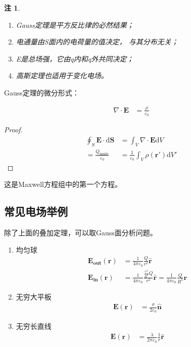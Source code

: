 \documentclass[12pt,onecolumn,a4paper]{book}
\newtheorem*{note}{注}
\numberwithin{table}{subsection}
\numberwithin{equation}{subsection}
\begin{document}
\begin{note}
    \begin{enumerate}
        \item Gauss定理是平方反比律的必然结果；
        \item 电通量由S面内的电荷量的值决定， 与其分布无关；
        \item E是总场强，它由q内和q外共同决定；
        \item 高斯定理也适用于变化电场。
    \end{enumerate}
\end{note}

Gauss定理的微分形式：

\begin{align}
    \nabla \cdot \mathbf{E} & = \frac{\rho}{\varepsilon_0}
\end{align}

\begin{proof}
    \begin{align}
        \oint_{S} \mathbf{E} \cdot \mathrm{d} \mathbf{S} & = \int_{V} \nabla \cdot \mathbf{E} \mathrm{d} V                    \\
        = \frac{Q_{\text{inside}}}{\varepsilon_0}
                                                         & = \frac{1}{\varepsilon_0} \int_{V} \rho(\mathbf{r'}) \mathrm{d} V'
    \end{align}
\end{proof}

这是Maxwell方程组中的第一个方程。

\subsection{常见电场举例}

除了上面的叠加定理，可以取Gauss面分析问题。

\begin{enumerate}
    \item 均匀球
          \begin{align}
              \mathbf{E_\text{out}}(\mathbf{r}) & = \frac{1}{4 \pi \varepsilon_0} \frac{Q}{r^2} \hat{\mathbf{r}}                                                                          \\
              \mathbf{E_\text{in}}(\mathbf{r})  & =  \frac{1}{4 \pi \varepsilon_0} \frac{\frac{r^3}{R^3}Q}{r^2} \hat{\mathbf{r}} = \frac{1}{4 \pi \varepsilon_0} \frac{Q}{R^3} \mathbf{r}
          \end{align}
    \item 无穷大平板
          \begin{align}
              \mathbf{E}(\mathbf{r}) & = \frac{\sigma}{2 \varepsilon_0} \hat{\mathbf{n}}
          \end{align}
    \item 无穷长直线
          \begin{align}
              \mathbf{E}(\mathbf{r}) & = \frac{\lambda}{2 \pi \varepsilon_0} \frac{1}{r} \hat{\mathbf{r}}
          \end{align}
\end{enumerate}
\end{document}
